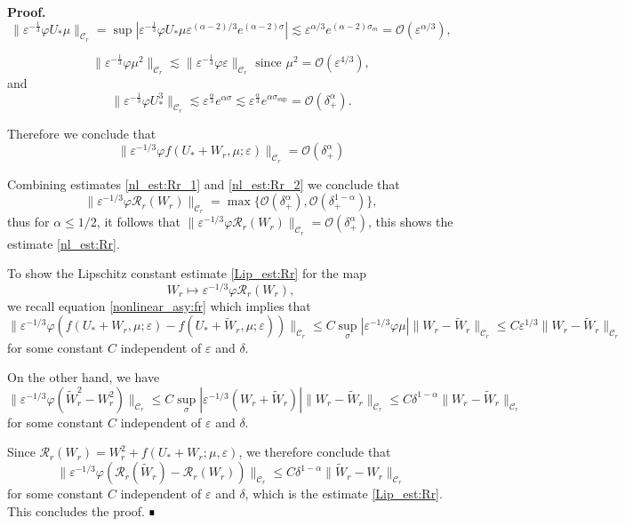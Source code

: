 \documentclass[letterpaper,11pt]{article}
\newcommand{\Ral}{\mathcal{R}}
\newcommand{\rmO}{\mathcal{O}}
\newcommand{\eps}{\varepsilon}
\newcommand{\lar}{ \lesssim }
\numberwithin{equation}{section}
\theoremstyle{plain}
\newenvironment{Proof}[1][.]%
 {\begin{trivlist}\item[]\textbf{Proof#1 }}%
 {\hspace*{\fill}$\rule{0.3\baselineskip}{0.35\baselineskip}$\end{trivlist}}
\begin{document}
\begin{Proof}
\[
\|\eps^{-\frac{1}{3}}\varphi U_*\mu \|_{\mathcal{C}_r} =\sup |\eps^{-\frac{1}{3}} \varphi  U_*\mu  \eps^{(\alpha-2)/3}e^{(\alpha-2)\sigma} | \lar \eps^{\alpha/3} e^{(\alpha-2)\sigma_m}  =\rmO( \eps^{\alpha/3}) ,
\]

\[
\|\eps^{-\frac{1}{3}}\varphi \mu^2 \|_{\mathcal{C}_r} \lar \|\eps^{-\frac{1}{3}}\varphi \eps \|_{\mathcal{C}_r} \text{ since } \mu^2 = \rmO(\eps^{4/3}), 
\]
and
\[
\|\eps^{-\frac{1}{3}}\varphi U_*^3\|_{\mathcal{C}_r} \lar \eps^{\frac{\alpha}{3}} e^{\alpha\sigma} \lar \eps^{\frac{\alpha}{3}} e^{\alpha\sigma_{\sup}} = \rmO(\delta_+^\alpha).
\]

Therefore we conclude that
\begin{equation}\label{nl_est:Rr_2}
\|\eps^{-1/3}\varphi f(U_*+W_r, \mu ;\eps)\|_{\mathcal{C}_r} = \rmO(\delta^{\alpha}_+)
\end{equation}

Combining estimates \eqref{nl_est:Rr_1} and \eqref{nl_est:Rr_2} we conclude that 
\[
\|\eps^{-1/3}\varphi \Ral_r(W_r) \|_{\mathcal{C}_r} = \max\{ \rmO(\delta_+^\alpha), \rmO(\delta_+^{1-\alpha})\},
\]
thus for $\alpha \le 1/2$, it follows that $\|\eps^{-1/3}\varphi \Ral_r(W_r) \|_{\mathcal{C}_r} = \rmO(\delta_+^\alpha)$, this shows the estimate \eqref{nl_est:Rr}.

To show the Lipschitz constant estimate \eqref{Lip_est:Rr} for the map
\[ 
W_r \mapsto \eps^{-1/3}\varphi \mathcal{R}_r(W_r),
\] 
we recall equation \eqref{nonlinear_asy:fr} which implies that 
\[
\|\eps^{-1/3}\varphi(f(U_*+W_r,\mu;\eps)-f(U_*+\widetilde{W}_r,\mu;\eps))\|_{\mathcal{C}_r} \le C\sup_{\sigma}|\eps^{-1/3}\varphi\mu|\|W_r- \widetilde{W}_r\|_{\mathcal{C}_r} \le C\eps^{1/3}\|W_r- \widetilde{W}_r \|_{\mathcal{C}_r}
\]
for some constant $C$ independent of $\eps$ and $\delta$.

On the other hand, we have
\[
\|\eps^{-1/3}\varphi(\widetilde{W}_r^2-W_r^2 )\|_{\mathcal{C}_r} \le C\sup_{\sigma}|\eps^{-1/3}(W_r+\tilde{W}_r)|\|W_r- \widetilde{W}_r\|_{\mathcal{C}_r} \le C\delta^{1-\alpha}\|W_r- \widetilde{W}_r \|_{\mathcal{C}_r}
\]
for some constant $C$ independent of $\eps$ and $\delta$.

Since $\mathcal{R}_r(W_r) = W_r^2 + f(U_*+W_r;\mu,\eps)$, we therefore conclude that
\[
\|\eps^{-1/3}\varphi(\mathcal{R}_r(\widetilde{W}_r) - \mathcal{R}_r(W_r)) \|_{\mathcal{C}_r}\le C\delta^{1-\alpha} \|\widetilde{W}_r - W_r \|_{\mathcal{C}_r}
\]
for some constant $C$ independent of $\eps$ and $\delta$, which is the estimate \eqref{Lip_est:Rr}. This concludes the proof.
\end{Proof}
\end{document}
